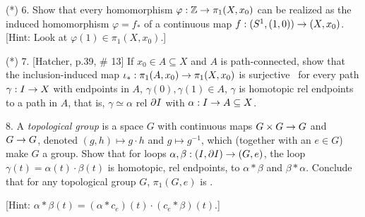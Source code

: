 \documentclass[12pt]{article}
\begin{document}
\begin{description}
\item{(*)} 6. Show that every homomorphism $\varphi:{\mathbb Z}\rightarrow \pi_1(X,x_0)$ can be realized as 
the induced homomorphism $\varphi=f_*$ of a continuous map $f:(S^1,(1,0))\rightarrow (X,x_0)$. 
[Hint: Look at $\varphi(1)\in\pi_1(X,x_0)$.]

\msk

\item{(*)} 7. [Hatcher, p.39, \# 13] If $x_0\in A\subseteq X$ and $A$ is path-connected, show that the inclusion-induced map
$\iota_*:\pi_1(A,x_0)\rightarrow\pi_1(X,x_0)$ is surjective \lra\ for every path $\gamma:I\rightarrow X$ with endpoints in
$A$, $\gamma(0),\gamma(1)\in A$, $\gamma$ is homotopic rel endpoints to a path in $A$, that is,
$\gamma\simeq\alpha$ rel $\partial I$ with $\alpha:I\rightarrow A\subseteq X$.

\msk

\item{8.} A {\it topological group} is a space $G$ with continuous maps $G\times G\rightarrow G$ and $G\rightarrow G$, denoted
$(g,h)\mapsto g\cdot h$ and $g\mapsto g^{-1}$, which (together with an $e\in G$) make $G$ a group. Show that
for loops $\alpha,\beta:(I,\partial I)\rightarrow (G,e)$, the loop $\gamma(t)=\alpha(t)\cdot\beta(t)$ is homotopic,
rel endpoints, to  $\alpha*\beta$ and $\beta*\alpha$. Conclude that for any
topological group $G$, $\pi_1(G,e)$ is .

\ssk

\item{\spc} [Hint: $\alpha*\beta(t) = (\alpha*c_e)(t)\cdot(c_e*\beta)(t)$.]


\end{description}
\vfill
\end{document}
